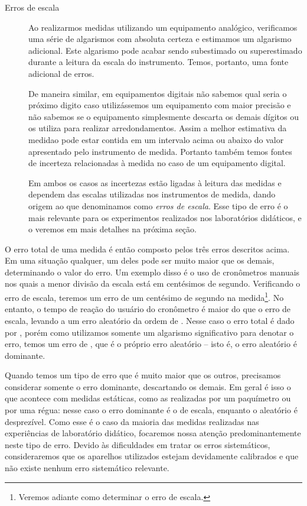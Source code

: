 \begin{description}
\item[Erros de escala] Ao realizarmos medidas utilizando um equipamento analógico, verificamos uma série de algarismos com absoluta certeza e estimamos um algarismo adicional. Este algarismo pode acabar sendo subestimado ou superestimado durante a leitura da escala do instrumento. Temos, portanto, uma fonte adicional de erros. 

De maneira similar, em equipamentos digitais não sabemos qual seria o próximo digito caso utilizássemos um equipamento com maior precisão e não sabemos se o equipamento simplesmente descarta os demais dígitos ou os utiliza para realizar arredondamentos. Assim a melhor estimativa da medidao pode estar contida em um intervalo acima ou abaixo do valor apresentado pelo instrumento de medida. Portanto também temos fontes de incerteza relacionadas à medida no caso de um equipamento digital.

Em ambos os casos as incertezas estão ligadas à leitura das medidas e dependem das escalas utilizadas nos instrumentos de medida, dando origem ao que denominamos como \emph{erros de escala}. Esse tipo de erro é o mais relevante para os experimentos realizados nos laboratórios didáticos, e o veremos em mais detalhes na próxima seção.
\end{description}

O erro total de uma medida é então composto pelos três erros descritos acima. Em uma situação qualquer, um deles pode ser muito maior que os demais, determinando o valor do erro. Um exemplo disso é o uso de cronômetros manuais nos quais a menor divisão da escala está em centésimos de segundo. Verificando o erro de escala, teremos um erro de um centésimo de segundo na medida\footnote{Veremos adiante como determinar o erro de escala.}. No entanto, o tempo de reação do usuário do cronômetro é maior do que o erro de escala, levando a um erro aleatório da ordem de . Nesse caso o erro total é dado por , porém como utilizamos somente um algarismo significativo para denotar o erro, temos um erro de , que é o próprio erro aleatório -- isto é, o erro aleatório é dominante.

Quando temos um tipo de erro que é muito maior que os outros, precisamos considerar somente o erro dominante, descartando os demais. Em geral é isso o que acontece com medidas estáticas, como as realizadas por um paquímetro ou por uma régua: nesse caso o erro dominante é o de escala, enquanto o aleatório é desprezível. Como esse é o caso da maioria das medidas realizadas nas experiências de laboratório didático, focaremos nossa atenção predominantemente neste tipo de erro. Devido às dificuldades em tratar os erros sistemáticos, consideraremos que os aparelhos utilizados estejam devidamente calibrados e que não existe nenhum erro sistemático relevante.


